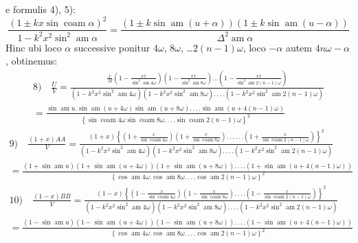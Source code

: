 \documentclass{article}
\begin{document}
e formulis 4), 5):
\[
\frac{\left(1\pm kx\sin\operatorname{coam}\alpha\right)^{2}}{1-k^{2}x^{2}\sin^{2}\operatorname{am}\alpha}=\frac{\left(1\pm k\sin\operatorname{am}(u+\alpha)\right)\left(1\pm k\sin\operatorname{am}(u-\alpha)\right)}{\Delta^{2}\operatorname{am}\alpha}
\]
Hinc ubi loco $\alpha$ successive ponitur $4\omega$, $8\omega$, \ldots $2(n-1)\omega$, loco $-\alpha$ autem $4n\omega-\alpha$, obtinemus:
\[
\begin{gathered}
\text{8)}\quad\frac{U}{V}=\frac{\frac{x}{M}\left(1-\frac{xx}{\sin^{2}\operatorname{am}4\omega}\right)\left(1-\frac{xx}{\sin^{2}\operatorname{am}8\omega}\right)\ldots\left(1-\frac{xx}{\sin^{2}\operatorname{am}2(n-1)\omega}\right)}{\left(1-k^{2}x^{2}\sin^{2}\operatorname{am}4\omega\right)\left(1-k^{2}x^{2}\sin^{2}\operatorname{am}8\omega\right).\,.\,.\,.\left(1-k^{2}x^{2}\sin^{2}\operatorname{am}2(n-1)\omega\right)}\\[1.5ex]
=\frac{\sin\operatorname{am}u.\sin\operatorname{am}(u+4\omega)\sin\operatorname{am}(u+8\omega).\,.\,.\,.\sin\operatorname{am}(u+4(n-1)\omega)}{\left\{\sin\operatorname{coam}4\omega\sin\operatorname{coam}8\omega.\,.\,.\,.\sin\operatorname{coam}2(n-1)\omega\right\}^{2}}
\end{gathered}
\]
\[
\begin{gathered}
\text{9)}\quad\frac{(1+x)AA}{V}=\frac{(1+x)\left\{\left(1+\frac{x}{\sin\operatorname{coam}4\omega}\right)\left(1+\frac{x}{\sin\operatorname{coam}8\omega}\right).\,.\,.\,.\,.\,.\left(1+\frac{x}{\sin\operatorname{coam}2(n-1)\omega}\right)\right\}^{2}}{\left(1-k^{2}x^{2}\sin^{2}\operatorname{am}4\omega\right)\left(1-k^{2}x^{2}\sin^{2}\operatorname{am}8\omega\right).\,.\,.\,.\left(1-k^{2}x^{2}\sin^{2}\operatorname{am}2(n-1)\omega\right)}\\[1.5ex]
=\frac{\left(1+\sin\operatorname{am}u\right)\left(1+\sin\operatorname{am}(u+4\omega)\right)\left(1+\sin\operatorname{am}(u+8\omega)\right).\,.\,.\,.\left(1+\sin\operatorname{am}(u+4(n-1)\omega)\right)}{\left\{\cos\operatorname{am}4\omega.\cos\operatorname{am}8\omega.\,.\,.\,.\cos\operatorname{am}2(n-1)\omega\right\}^{2}}
\end{gathered}
\]
\[
\begin{gathered}
\text{10)}\quad\frac{(1-x)BB}{V}=\frac{(1-x)\left\{\left(1-\frac{x}{\sin\operatorname{coam}4\omega}\right)\left(1-\frac{x}{\sin\operatorname{coam}8\omega}\right).\,.\,.\,.\left(1-\frac{x}{\sin\operatorname{coam}2(n-1)\omega}\right)\right\}^{2}}{\left(1-k^{2}x^{2}\sin^{2}\operatorname{am}4\omega\right)\left(1-k^{2}x^{2}\sin^{2}\operatorname{am}8\omega\right).\,.\,.\,.\left(1-k^{2}x^{2}\sin^{2}\operatorname{am}2(n-1)\omega\right)}\\[1.5ex]
=\frac{\left(1-\sin\operatorname{am}u\right)\left(1-\sin\operatorname{am}(u+4\omega)\right)\left(1-\sin\operatorname{am}(u+8\omega)\right).\,.\,.\,.\left(1-\sin\operatorname{am}(u+4(n-1)\omega)\right)}{\left\{\cos\operatorname{am}4\omega.\cos\operatorname{am}8\omega.\,.\,.\,.\cos\operatorname{am}2(n-1)\omega\right\}^{2}}
\end{gathered}
\]
\end{document}
